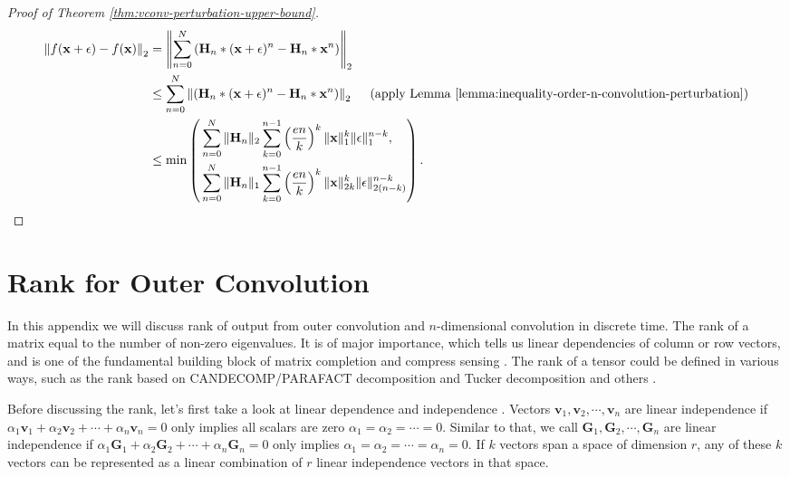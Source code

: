 \documentclass[twoside,11pt]{article}
\def\tvar#1{\mathbf{#1}} %
\begin{document}
\begin{proof}[Proof of Theorem \ref{thm:vconv-perturbation-upper-bound}]
  \begin{equation*}
    \begin{aligned}
      \left\|f(\tvar{x} + \epsilon) - f(\tvar{x}) \right\|_2
       & = \left\|
      \sum_{n=0}^{N} \left(
      \tvar{H}_n * ( \tvar{x} + \epsilon )^n - \tvar{H}_n * \tvar{x}^n
      \right)
      \right\|_2                                                                                  \\
       & \le \sum_{n=0}^{N} \left\|
      \left(
      \tvar{H}_n * ( \tvar{x} + \epsilon )^n - \tvar{H}_n * \tvar{x}^n
      \right)
      \right\|_2
      ~~~~ \text{(apply Lemma \ref{lemma:inequality-order-n-convolution-perturbation})} \\
       & \le \min\left(\begin{aligned}
           & \sum_{n=0}^{N} \| \tvar{H}_n \|_2 \sum_{k=0}^{n-1} \left(\dfrac{e n}{k}\right)^k \|\tvar{x}\|_1^k \| \epsilon \|_1^{n-k},                 \\
           & \sum_{n=0}^{N} \| \tvar{H}_n \|_1 \sum_{k=0}^{n-1} \left(\dfrac{e n}{k}\right)^k \|\tvar{x}\|_{2k}^k \| \tvar{\epsilon} \|_{2(n-k)}^{n-k}
        \end{aligned}\right).
    \end{aligned}
  \end{equation*}
\end{proof}

\section{Rank for Outer Convolution}
\label{appendix:convolution-rank}

In this appendix we will discuss rank of output from outer convolution and \(n\)-dimensional convolution in discrete time.
The rank of a matrix equal to the number of non-zero eigenvalues.
It is of major importance, which tells us linear dependencies of column or row vectors, and is one of the fundamental building block of matrix completion and compress sensing \citep{Candes2006, Donoho2006, Sidiropoulos2017}.
The rank of a tensor could be defined in various ways, such as the rank based on CANDECOMP/PARAFACT decomposition and Tucker decomposition and others \citep{Kolda209TensorDecompositionAndApplication}.

Before discussing the rank, let's first take a look at linear dependence and independence \citep{Horn1985}.
Vectors \(\tvar{v}_1, \tvar{v}_2, \cdots, \tvar{v}_n\) are linear independence if \(\alpha_1 \tvar{v}_1 + \alpha_2 \tvar{v}_2 + \cdots + \alpha_n \tvar{v}_n = 0\) only implies all scalars are zero \(\alpha_1 = \alpha_2 = \cdots = 0\).
Similar to that, we call \(\tvar{G}_1, \tvar{G}_2, \cdots, \tvar{G}_n\) are linear independence if \(\alpha_1 \tvar{G}_1 + \alpha_2 \tvar{G}_2 + \cdots + \alpha_n \tvar{G}_n = 0\) only implies \(\alpha_1 = \alpha_2 = \cdots = \alpha_n = 0\).
If \(k\) vectors span a space of dimension \(r\), any of these \(k\) vectors can be represented as a linear combination of \(r\) linear independence vectors in that space.
\end{document}
